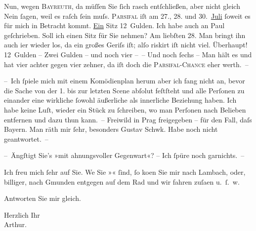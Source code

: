 \pstart
           Nun, wegen \textsc{Bayreuth}, da müſſen Sie ſich rasch {\pb}entſchließen, aber
               nicht gleich Nein ſagen, weil es raſch ſein muſs. \textsc{Parsifal} iſt am 27., 28. und 30. \uline{Juli}{ }ſoweit es für mich in Betracht kommt. \uline{Ein}{ }Sitz 12 Gulden. Ich habe auch an Paul geſchrieben. Soll ich ei{\pb}nen Sitz für Sie nehmen? Am liebſten 28.
               Man bringt ihn auch i{\geminationm}er wieder los, da ein großes
               Geriſs iſt; alſo riskirt iſt nicht viel. Überhaupt! 12 Gulden – Zwei Gulden – und
               noch vier – – Und noch ſechs – Man {\pb}hält es und hat
               vier achter gegen vier zehner, da iſt doch die \textsc{Parsifal-Chance} eher werth. –\pend
           
\pstart
           – Ich ſpiele mich mit einem Komödienplan herum {\dotsfour} aber ich fang nicht an,
               bevor die Sache von der 1. bis zur letzten Scene abſolut feſtſteht und alle {\pb}Perſonen zu einander eine wirkliche ſowohl äußerliche
               als innerliche Beziehung haben. Ich habe keine Luſt, wieder ein Stück zu ſchreiben,
               wo man Perſonen nach Belieben entfernen und dazu thun kann. – Freiwild in Prag frei{\pb}gegeben – für den Fall, daſs Bayern. Man räth mir ſehr, besonders Gustav Schwk. Habe noch nicht geantwortet. –\pend
           
\pstart
           – Ängſtigt Sie’s »mit ahnungsvoller
                  Gegenwart«? – Ich ſpüre noch garnichts. –\pend
           
\pstart
           Ich freu mich ſehr auf Sie. We{\geminationn}{ }{\pb}Sie »\textsc{}« ſind, ſo ko{\geminationm}en Sie mir nach Lambach, oder, billiger, nach Gmunden entgegen auf dem Rad und wir fahren zuſa{\geminationm}en u. ſ. w.\pend
           
\pstart
           Antworten Sie mir gleich.\pend
           
\pstart
           Herzlich Ihr{\\}\spacefill\mbox{Arthur.}\pend
           \endnumbering{}  
      